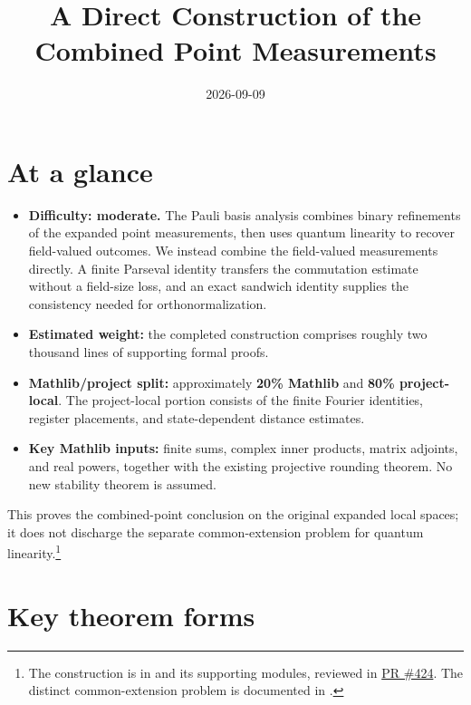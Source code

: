\documentclass[11pt]{article}
\title{A Direct Construction of the Combined Point Measurements}
\author{}
\date{2026-09-09}
\renewcommand{\ghpr}[1]{%
  \href{https://github.com/Dengnifer/MIPStarRE-A/pull/#1}{PR \##1}}
\begin{document}
\maketitle

\section{At a glance}

\begin{itemize}
  \item \textbf{Difficulty: moderate.}  The Pauli basis analysis combines
  binary refinements of the expanded point measurements, then uses quantum
  linearity to recover field-valued outcomes.  We instead combine the
  field-valued measurements directly.  A finite Parseval identity transfers
  the commutation estimate without a field-size loss, and an exact sandwich
  identity supplies the consistency needed for orthonormalization.
  \item \textbf{Estimated weight:} the completed construction comprises
  roughly two thousand lines of supporting formal proofs.
  \item \textbf{Mathlib/project split:} approximately \textbf{20\% Mathlib}
  and \textbf{80\% project-local}.  The project-local portion consists of the
  finite Fourier identities, register placements, and state-dependent distance
  estimates.
  \item \textbf{Key Mathlib inputs:} finite sums, complex inner products,
  matrix adjoints, and real powers, together with the existing projective
  rounding theorem.  No new stability theorem is assumed.
\end{itemize}

This proves the combined-point conclusion on the original expanded local
spaces; it does not discharge the separate common-extension problem for
quantum linearity.\footnote{The construction is in
 and its supporting modules, reviewed
in \ghpr{424}.  The distinct common-extension problem is documented in
.}

\section{Key theorem forms}
\end{document}
